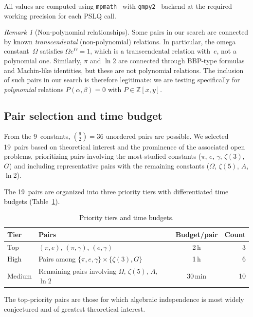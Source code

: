 \documentclass[11pt]{amsart}
\theoremstyle{remark}
\newtheorem{remark}[theorem]{Remark}
\newcommand{\Z}{\mathbb{Z}}
\begin{document}
All values are computed using \texttt{mpmath}~\cite{mpmath} with
\texttt{gmpy2}~\cite{gmpy2} backend at the required working precision for each PSLQ
call.

\begin{remark}[Non-polynomial relationships]
Some pairs in our search are connected by known \emph{transcendental}
(non-polynomial) relations. In particular, the omega constant~$\Omega$ satisfies
$\Omega e^\Omega=1$, which is a transcendental relation with~$e$, not a polynomial
one. Similarly, $\pi$ and $\ln 2$ are connected through BBP-type formulas and
Machin-like identities, but these are not polynomial relations. The inclusion of such
pairs in our search is therefore legitimate: we are testing specifically for
\emph{polynomial} relations $P(\alpha,\beta)=0$ with $P\in\Z[x,y]$.
\end{remark}

\subsection{Pair selection and time budget}\label{ssec:pairs}

From the 9~constants, $\binom{9}{2}=36$ unordered pairs are possible. We selected
19~pairs based on theoretical interest and the prominence of the associated open
problems, prioritizing pairs involving the most-studied constants ($\pi$, $e$,
$\gamma$, $\zeta(3)$, $G$) and including representative pairs with the remaining
constants ($\Omega$, $\zeta(5)$, $A$, $\ln 2$).

The 19~pairs are organized into three priority tiers with differentiated time budgets
(Table~\ref{tab:tiers}).

\begin{table}[ht]
\centering
\caption{Priority tiers and time budgets.}\label{tab:tiers}
\begin{tabular}{@{}llcr@{}}
\toprule
Tier & Pairs & Budget/pair & Count \\
\midrule
Top    & $(\pi,e)$, $(\pi,\gamma)$, $(e,\gamma)$
       & 2\,h & 3 \\
High   & Pairs among $\{\pi,e,\gamma\}\times\{\zeta(3),G\}$
       & 1\,h & 6 \\
Medium & Remaining pairs involving $\Omega$, $\zeta(5)$, $A$, $\ln 2$
       & 30\,min & 10 \\
\bottomrule
\end{tabular}
\end{table}

The top-priority pairs are those for which algebraic independence is most widely
conjectured and of greatest theoretical interest.
\end{document}

